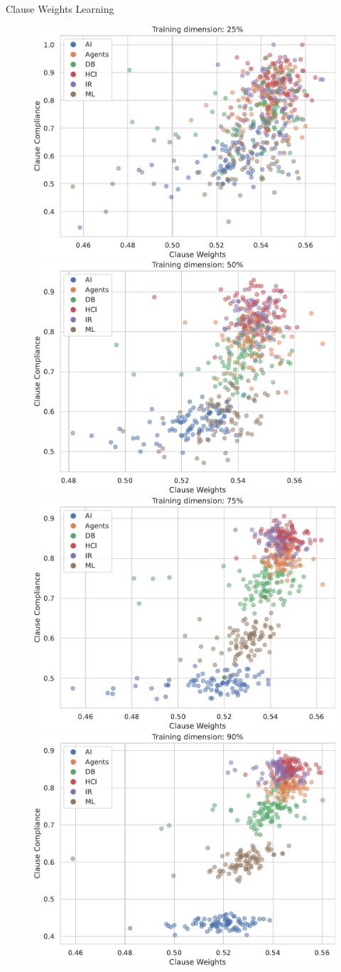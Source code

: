\documentclass{beamer}
\begin{document}
\begin{frame}{Clause Weights Learning}
	\begin{figure}
		\includegraphics[width=0.41\linewidth]{images/scatter_25.pdf}%
		\includegraphics[width=0.41\linewidth]{images/scatter_50.pdf}
		\includegraphics[width=0.41\linewidth]{images/scatter_75.pdf}%
		\includegraphics[width=0.41\linewidth]{images/scatter_90.pdf}
	\end{figure}
\end{frame}


\end{document}
